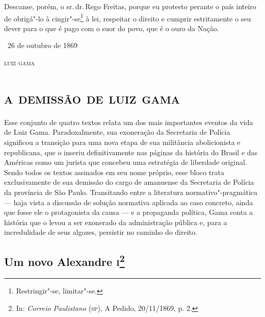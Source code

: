 Descanse, porém, o sr.\,dr.\,Rego Freitas, porque eu protesto perante o
país inteiro de obrigá"-lo à cingir"-se\footnote{Restringir"-se,
  limitar"-se.} à lei,
respeitar o direito e cumprir estritamente o seu dever para o que é pago
com o suor do povo, que é o ouro da Nação.

\medskip

\hfill\ 26 de outubro de 1869\smallskip

\hfill\textsc{luiz gama}

\begingroup\makeatletter\@openrightfalse
\part{\textsc{a demissão de luiz gama}}

\thispagestyle{empty}
\mbox{}\vfill
{\footnotesize\noindent
Esse conjunto de quatro textos relata um dos mais importantes
eventos da vida de Luiz Gama. Paradoxalmente, sua exoneração da
Secretaria de Polícia significou a transição para uma nova etapa de sua
militância abolicionista e republicana, que o inseriu definitivamente
nas páginas da história do Brasil e das Américas
como um jurista que concebeu uma estratégia de liberdade original. Sendo
todos os textos assinados em seu nome próprio, esse bloco trata
exclusivamente de sua demissão do cargo de amanuense da Secretaria de
Polícia da província de São Paulo. Transitando entre a literatura
normativo"-pragmática --- haja vista a discussão de solução normativa
aplicada ao caso concreto, ainda que fosse ele o protagonista da causa
--- e a propaganda política, Gama conta a história que o levou a ser
exonerado da administração pública e, para a incredulidade de seus
algozes, persistir no caminho do direito.}
\@openrighttrue\makeatother \endgroup

\pagebreak
\movetooddpage


\chapter{Um novo Alexandre \textsc{i}\footnote[*]{In: \emph{Correio Paulistano}
  (\textsc{sp}), A Pedido, 20/11/1869, p. 2.}}

